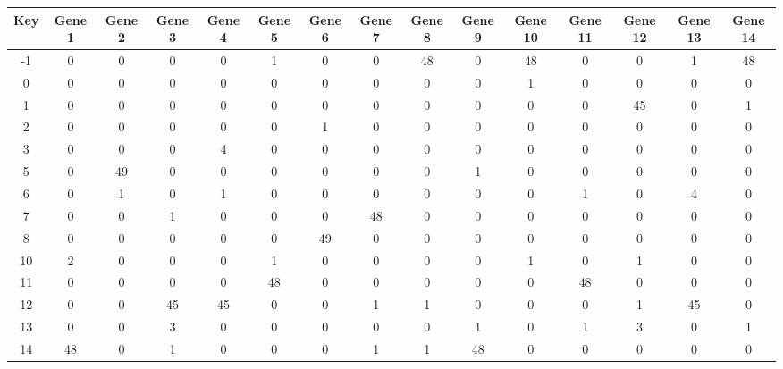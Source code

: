 \begin{tabular}{|c|c|c|c|c|c|c|c|c|c|c|c|c|c|c|}
\hline
Key & Gene 1 & Gene 2 & Gene 3 & Gene 4 & Gene 5 & Gene 6 & Gene 7 & Gene 8 & Gene 9 & Gene 10 & Gene 11 & Gene 12 & Gene 13 & Gene 14 \\
\hline
-1 & 0 & 0 & 0 & 0 & 1 & 0 & 0 & 48 & 0 & 48 & 0 & 0 & 1 & 48 \\
0 & 0 & 0 & 0 & 0 & 0 & 0 & 0 & 0 & 0 & 1 & 0 & 0 & 0 & 0 \\
1 & 0 & 0 & 0 & 0 & 0 & 0 & 0 & 0 & 0 & 0 & 0 & 45 & 0 & 1 \\
2 & 0 & 0 & 0 & 0 & 0 & 1 & 0 & 0 & 0 & 0 & 0 & 0 & 0 & 0 \\
3 & 0 & 0 & 0 & 4 & 0 & 0 & 0 & 0 & 0 & 0 & 0 & 0 & 0 & 0 \\
5 & 0 & 49 & 0 & 0 & 0 & 0 & 0 & 0 & 1 & 0 & 0 & 0 & 0 & 0 \\
6 & 0 & 1 & 0 & 1 & 0 & 0 & 0 & 0 & 0 & 0 & 1 & 0 & 4 & 0 \\
7 & 0 & 0 & 1 & 0 & 0 & 0 & 48 & 0 & 0 & 0 & 0 & 0 & 0 & 0 \\
8 & 0 & 0 & 0 & 0 & 0 & 49 & 0 & 0 & 0 & 0 & 0 & 0 & 0 & 0 \\
10 & 2 & 0 & 0 & 0 & 1 & 0 & 0 & 0 & 0 & 1 & 0 & 1 & 0 & 0 \\
11 & 0 & 0 & 0 & 0 & 48 & 0 & 0 & 0 & 0 & 0 & 48 & 0 & 0 & 0 \\
12 & 0 & 0 & 45 & 45 & 0 & 0 & 1 & 1 & 0 & 0 & 0 & 1 & 45 & 0 \\
13 & 0 & 0 & 3 & 0 & 0 & 0 & 0 & 0 & 1 & 0 & 1 & 3 & 0 & 1 \\
14 & 48 & 0 & 1 & 0 & 0 & 0 & 1 & 1 & 48 & 0 & 0 & 0 & 0 & 0 \\
\hline
\end{tabular}